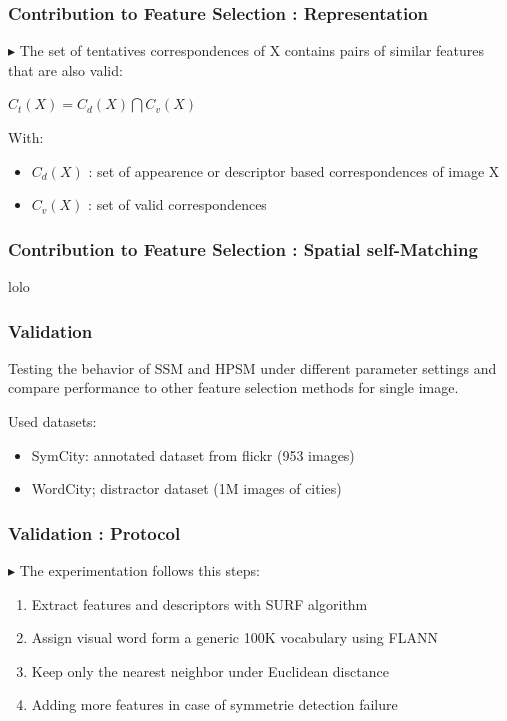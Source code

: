 \documentclass[11pt]{beamer}
\begin{document}
\begin{frame}
\frametitle{Contribution to Feature Selection : Representation}
$\blacktriangleright$ The set of tentatives correspondences of X contains pairs of similar features that are also valid:
\begin{center}
$C_t(X) = C_d(X) \bigcap C_v(X) $
\end{center}

With:
\begin{itemize}
\item $C_d(X)$ : set of appearence or descriptor based correspondences of image X
\item $C_v(X)$ : set of valid correspondences 
\end{itemize}
\end{frame}

\begin{frame}
\frametitle{Contribution to Feature Selection : Spatial self-Matching}

lolo


\end{frame}




\begin{frame}
\frametitle{Validation}
Testing the behavior of SSM and HPSM under different parameter settings and compare performance to other feature selection methods for single image.

\vspace{0.3cm}
Used datasets:
\begin{itemize}
\item SymCity: annotated dataset from flickr (953 images)
\item WordCity; distractor dataset (1M images of cities)
\end{itemize}

\end{frame}

\begin{frame}
\frametitle{Validation : Protocol}
$\blacktriangleright$ The experimentation follows this steps:
\begin{enumerate}
\item Extract features and descriptors with SURF algorithm
\item Assign visual word form a generic 100K vocabulary using FLANN
\item Keep only the nearest neighbor under Euclidean disctance
\item Adding more features in case of symmetrie detection failure 
\end{enumerate}
\end{frame}
\end{document}
